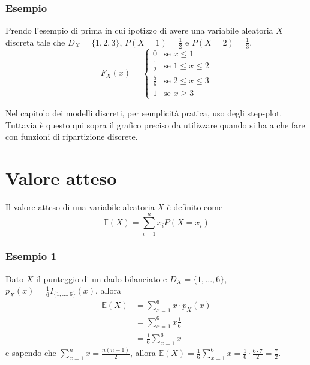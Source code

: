 \documentclass[11pt]{report}
\newenvironment{warning}{
  \begin{warningbox}
}{
  \end{warningbox}
}
\begin{document}
\subsubsection{Esempio}
Prendo l'esempio di prima in cui ipotizzo di avere una variabile aleatoria $X$ discreta tale che $D_X = \{1,2,3\}$, $P(X=1) = \frac{1}{2}$ e $P(X=2) = \frac{1}{3}$.
\begin{equation}
	F_X(x) =
	\begin{cases}
        0           & \text{se } x \leq 1 \\
		\frac{1}{2} & \text{se } 1 \leq x \leq 2\\
        \frac{5}{6} & \text{se } 2 \leq x \leq 3\\
		1           & \text{se } x \geq 3
    \end{cases}
\end{equation}
\begin{center}
    
\end{center}
\begin{warning}
Nel capitolo dei modelli discreti, per semplicità pratica, uso degli step-plot. Tuttavia è questo qui sopra il grafico preciso da utilizzare quando si ha a che fare con funzioni di ripartizione discrete.
\end{warning}

\section{Valore atteso}
Il valore atteso di una variabile aleatoria $X$ è definito come
\begin{equation}
    \mathbb{E}(X) = \sum_{i=1}^{n}x_iP(X=x_i)
\end{equation}
\subsubsection{Esempio 1}
Dato $X$ il punteggio di un dado bilanciato e $D_X = \{1,...,6\}$, $p_X(x) = \frac{1}{6}I_{\{1,...,6\}}(x)$, allora
\begin{equation}
	\begin{split}
		\mathbb{E}(X) & = \sum_{x=1}^{6}x \cdot p_X(x)\\
		& = \sum_{x=1}^{6}x \frac{1}{6}\\
		& = \frac{1}{6}\sum_{x=1}^{6} x
	\end{split}
\end{equation}
e sapendo che $\sum_{x=1}^{n}x = \frac{n(n+1)}{2}$, allora $\mathbb{E}(X) = \frac{1}{6}\sum_{x=1}^{6}x = \frac{1}{6} \cdot \frac{6 \cdot 7}{2} = \frac{7}{2}$.
\end{document}
